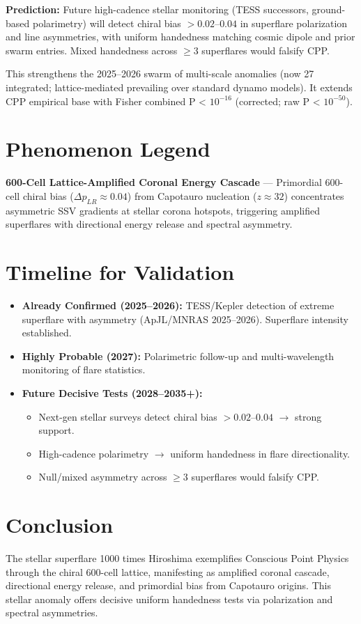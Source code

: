 \documentclass[11pt]{article}
\begin{document}
\textbf{Prediction:} Future high-cadence stellar monitoring (TESS successors, ground-based polarimetry) will detect chiral bias $>0.02$--$0.04$ in superflare polarization and line asymmetries, with uniform handedness matching cosmic dipole and prior swarm entries. Mixed handedness across $\geq 3$ superflares would falsify CPP.

This strengthens the 2025--2026 swarm of multi-scale anomalies (now 27 integrated; lattice-mediated prevailing over standard dynamo models). It extends CPP empirical base with Fisher combined P < $10^{-16}$ (corrected; raw P < $10^{-50}$).

\section{Phenomenon Legend}
\textbf{600-Cell Lattice-Amplified Coronal Energy Cascade} — Primordial 600-cell chiral bias ($\Delta p_{LR} \approx 0.04$) from Capotauro nucleation ($z \approx 32$) concentrates asymmetric SSV gradients at stellar corona hotspots, triggering amplified superflares with directional energy release and spectral asymmetry.

\section{Timeline for Validation}
\begin{itemize}
    \item \textbf{Already Confirmed (2025--2026):} TESS/Kepler detection of extreme superflare with asymmetry (ApJL/MNRAS 2025--2026). Superflare intensity established.
    \item \textbf{Highly Probable (2027):} Polarimetric follow-up and multi-wavelength monitoring of flare statistics.
    \item \textbf{Future Decisive Tests (2028--2035+):}
    \begin{itemize}
        \item Next-gen stellar surveys detect chiral bias $>0.02$--$0.04$ $\to$ strong support.
        \item High-cadence polarimetry $\to$ uniform handedness in flare directionality.
        \item Null/mixed asymmetry across $\geq 3$ superflares would falsify CPP.
    \end{itemize}
\end{itemize}

\section{Conclusion}
The stellar superflare 1000 times Hiroshima exemplifies Conscious Point Physics through the chiral 600-cell lattice, manifesting as amplified coronal cascade, directional energy release, and primordial bias from Capotauro origins. This stellar anomaly offers decisive uniform handedness tests via polarization and spectral asymmetries.  
\end{document}
